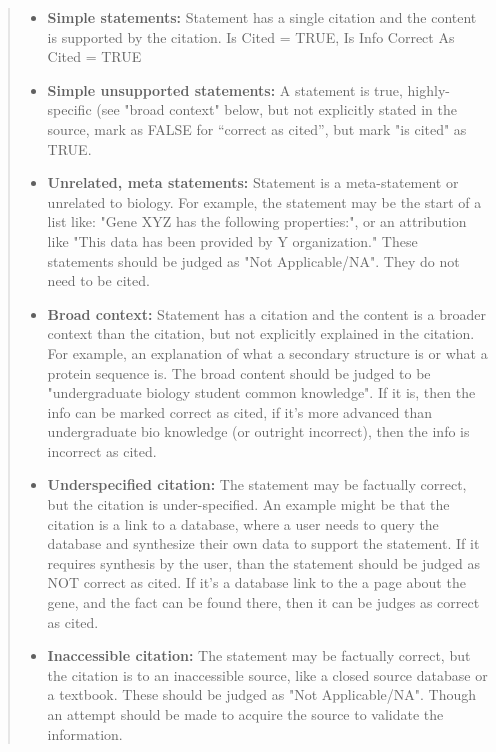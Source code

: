 \begin{quote}
\begin{itemize}

\item{\textbf{Simple statements:} Statement has a single citation and the content is supported by the citation. Is Cited = TRUE, Is Info Correct As Cited = TRUE}

\item{\textbf{Simple unsupported statements:} A statement is true, highly-specific (see "broad context" below, but not explicitly stated in the source, mark as FALSE for “correct as cited”, but mark "is cited" as TRUE.}

\item{\textbf{Unrelated, meta statements:} Statement is a meta-statement or unrelated to biology. For example, the statement may be the start of a list like: "Gene XYZ has the following properties:", or an attribution like "This data has been provided by Y organization." These statements should be judged as "Not Applicable/NA". They do not need to be cited.}

\item{\textbf{Broad context:} Statement has a citation and the content is a broader context than the citation, but not explicitly explained in the citation. For example, an explanation of what a secondary structure is or what a protein sequence is. The broad content should be judged to be "undergraduate biology student common knowledge". If it is, then the info can be marked correct as cited, if it's more advanced than undergraduate bio knowledge (or outright incorrect), then the info is incorrect as cited.}

\item{\textbf{Underspecified citation:} The statement may be factually correct, but the citation is under-specified. An example might be that the citation is a link to a database, where a user needs to query the database and synthesize their own data to support the statement. If it requires synthesis by the user, than the statement should be judged as NOT correct as cited. If it's a database link to the a page about the gene, and the fact can be found there, then it can be judges as correct as cited. }

\item{\textbf{Inaccessible citation:} The statement may be factually correct, but the citation is to an inaccessible source, like a closed source database or a textbook. These should be judged as "Not Applicable/NA". Though an attempt should be made to acquire the source to validate the information.}


\end{itemize}
\end{quote}
